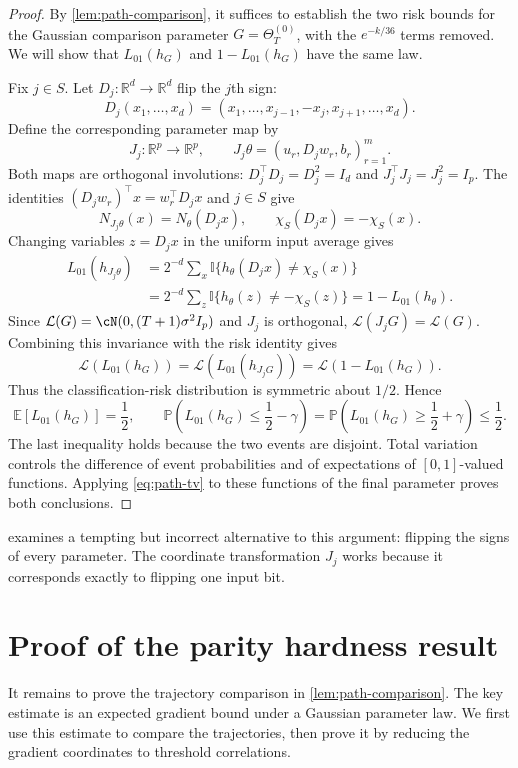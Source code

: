 \documentclass[11pt,twoside]{article}
\newcommand{\E}{\mathbb E}
\newcommand{\I}{\mathbb I}
\renewcommand{\P}{\mathbb P}
\newcommand{\Law}{\mathcal L}
\newcommand{\R}{\mathbb R}
\theoremstyle{definition}
\theoremstyle{remark}
\begin{document}
\begin{proof}
By \cref{lem:path-comparison}, it suffices to establish the two risk bounds
for the Gaussian comparison parameter $G=\Theta_T^{(0)}$, with the
$e^{-k/36}$ terms removed. We will show that $L_{01}(h_G)$ and
$1-L_{01}(h_G)$ have the same law.

Fix $j\in S$. Let $D_j:\R^d\to\R^d$ flip the $j$th sign:
\[
D_j(x_1,\ldots,x_d)
=(x_1,\ldots,x_{j-1},-x_j,x_{j+1},\ldots,x_d).
\]
Define the corresponding parameter map by
\[
J_j:\R^p\to\R^p,\qquad
J_j\theta=(u_r,D_jw_r,b_r)_{r=1}^m.
\]
Both maps are orthogonal involutions:
$D_j^\top D_j=D_j^2=I_d$ and $J_j^\top J_j=J_j^2=I_p$.
The identities $(D_jw_r)^\top x=w_r^\top D_jx$ and $j\in S$ give
\[
N_{J_j\theta}(x)=N_\theta(D_jx),
\qquad
\chi_S(D_jx)=-\chi_S(x).
\]
Changing variables $z=D_jx$ in the uniform input average gives
\begin{align*}
L_{01}(h_{J_j\theta})
&=2^{-d}\sum_x\I\{h_\theta(D_jx)\ne\chi_S(x)\}\\
&=2^{-d}\sum_z\I\{h_\theta(z)\ne-\chi_S(z)\}
=1-L_{01}(h_\theta).
\end{align*}
Since $\Law(G)=\cN(0,(T+1)\sigma^2I_p)$ and $J_j$ is orthogonal,
$\Law(J_jG)=\Law(G)$.
Combining this invariance with the risk identity gives
\[
\Law(L_{01}(h_G))
=\Law(L_{01}(h_{J_jG}))
=\Law(1-L_{01}(h_G)).
\]
Thus the classification-risk distribution is symmetric about $1/2$. Hence
\[
\E[L_{01}(h_G)]=\frac12,
\qquad
\P\!\left(L_{01}(h_G)\le\frac12-\gamma\right)
=\P\!\left(L_{01}(h_G)\ge\frac12+\gamma\right)\le\frac12.
\]
The last inequality holds because the two events are disjoint.
Total variation controls the difference of event probabilities and of
expectations of $[0,1]$-valued functions. Applying \cref{eq:path-tv} to these
functions of the final parameter proves both conclusions.
\end{proof}

 examines a tempting but incorrect
alternative to this argument: flipping the signs of every parameter. The
coordinate transformation $J_j$ works because it corresponds exactly to
flipping one input bit.

\section{Proof of the parity hardness result}
\label{sec:parity-proof}

It remains to prove the trajectory comparison in \cref{lem:path-comparison}.
The key estimate is an expected gradient bound under a Gaussian parameter
law. We first use this estimate to compare the trajectories, then prove it
by reducing the gradient coordinates to threshold correlations.
\end{document}
